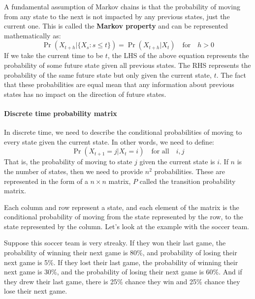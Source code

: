 A fundamental assumption of Markov chains is that the probability of moving from any state to the next is not impacted by any previous states, just the current one. This is called the \textbf{Markov property} and can be represented mathematically as:
$$ \Pr(X_{t+h}|\{X_s: s \leq t\}) = \Pr(X_{t+h}|X_t) \quad \text{for} \quad h > 0$$
If we take the current time to be $t$, the LHS of the above equation represents the probability of some future state given all previous states. The RHS represents the probability of the same future state but only given the current state, $t$. The fact that these probabilities are equal mean that any information about previous states has no impact on the direction of future states.


\paragraph{Discrete time probability matrix}
In discrete time, we need to describe the conditional probabilities of moving to every state given the current state. In other words, we need to define:
$$ \Pr(X_{t+1} = j|X_t = i) \quad \text{for all} \quad i, j$$
That is, the probability of moving to state $j$ given the current state is $i$. If $n$ is the number of states, then we need to provide $n^2$ probabilities. These are represented in the form of a $n\times n$ matrix, $P$ called the transition probability matrix.

Each column and row represent a state, and each element of the matrix is the conditional probability of moving from the state represented by the row, to the state represented by the column. Let's look at the example with the soccer team.

Suppose this soccer team is very streaky. If they won their last game, the probability of winning their next game is 80\%, and probability of losing their next game is 5\%. If they lost their last game, the probability of winning their next game is 30\%, and the probability of losing their next game is 60\%. And if they drew their last game, there is 25\% chance they win and 25\% chance they lose their next game.


